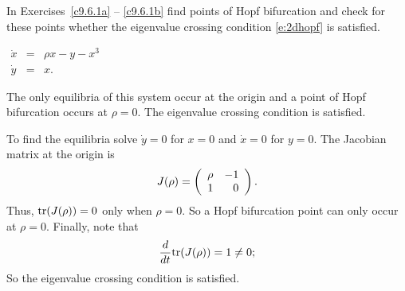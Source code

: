 \documentclass{ximera}
\begin{document}
\TEXER

\noindent In Exercises~\ref{c9.6.1a} -- \ref{c9.6.1b} find points of Hopf
bifurcation and check for these points whether the eigenvalue crossing
condition \eqref{e:2dhopf} is satisfied.
\begin{exercise} \label{c9.6.1a}
$\begin{array}{rcl}
\dot{x} & = & \rho x - y -x^3 \\
\dot{y} & = & x.
\end{array}$

\begin{solution}

\ans The only equilibria of this system occur at the origin and a point of
Hopf bifurcation occurs at $\rho=0$.  The eigenvalue crossing condition is
satisfied.

\soln  To find the equilibria solve $\dot{y}=0$ for $x=0$ and $\dot{x}=0$ for
$y=0$.  The Jacobian matrix at the origin is 
\[
J(\rho) = \left(\begin{array}{rr} \rho & -1\\ 1 &0\end{array}\right).
\]
Thus, ${\rm tr}(J(\rho))=0$ only when $\rho=0$.  So a Hopf bifurcation point
can only occur at $\rho=0$.  Finally, note that 
\[
\frac{d}{dt}{\rm tr}(J(\rho)) = 1 \neq 0;
\]
So the eigenvalue crossing condition is satisfied.


\end{solution}
\end{exercise}
\end{document}
